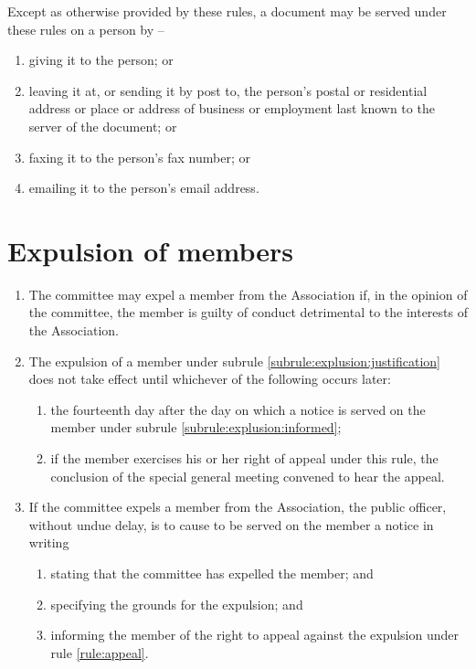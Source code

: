 \documentclass[a4paper,11pt]{article}
\begin{document}
Except as otherwise provided by these rules, a document may be served under these rules on a person by --
\begin{enumerate}
	\item giving it to the person; or
	\item leaving it at, or sending it by post to, the person's postal or residential address or place or address of business or employment last known to the server of the document; or
	\item faxing it to the person's fax number; or
	\item emailing it to the person's email address.
\end{enumerate}

\section{Expulsion of members}
\label{rule:explusion}

\begin{enumerate}
	\item \label{subrule:explusion:justification} The committee may expel a member from the Association if, in the opinion of the committee, the member is guilty of conduct detrimental to the interests of the Association.

	\item The expulsion of a member under subrule \ref{subrule:explusion:justification} does not take effect until whichever of the following occurs later:
		\begin{enumerate}
			\item the fourteenth day after the day on which a notice is served on the member under subrule \ref{subrule:explusion:informed};
			\item if the member exercises his or her right of appeal under this rule, the conclusion of the special general meeting convened to hear the appeal.
		\end{enumerate}
		
	\item \label{subrule:explusion:informed} If the committee expels a member from the Association, the public officer, without undue delay, is to cause to be served on the member a notice in writing
		\begin{enumerate}
			\item stating that the committee has expelled the member; and
			\item specifying the grounds for the expulsion; and
			\item informing the member of the right to appeal against the expulsion under rule \ref{rule:appeal}.
		\end{enumerate}
\end{enumerate}
\end{document}
